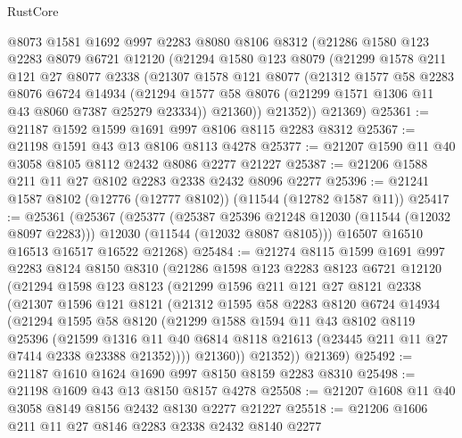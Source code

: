 \begin{lexlean}{RustCore}
\begin{coremodule}
    @8073
    @1581
    @1692
    @997
    @2283
    @8080
    @8106
    @8312
    (@21286
      @1580
      @123
      @2283
      @8079
      @6721
      @12120
      (@21294
        @1580
        @123
        @8079
        (@21299
          @1578
          @211
          @121
          @27
          @8077
          @2338
          (@21307
            @1578
            @121
            @8077
            (@21312
              @1577
              @58
              @2283
              @8076
              @6724
              @14934
              (@21294 @1577 @58 @8076 (@21299 @1571 @1306 @11 @43 @8060 @7387 @25279 @23334))
              @21360))
          @21352))
      @21369)
@25361 := @21187 @1592 @1599 @1691 @997 @8106 @8115 @2283 @8312
@25367 := @21198 @1591 @43 @13 @8106 @8113 @4278
@25377 := @21207 @1590 @11 @40 @3058 @8105 @8112 @2432 @8086 @2277 @21227
@25387 := @21206 @1588 @211 @11 @27 @8102 @2283 @2338 @2432 @8096 @2277
@25396 := @21241 @1587 @8102 (@12776 (@12777 @8102)) (@11544 (@12782 @1587 @11))
@25417 := @25361
    (@25367
      (@25377
        (@25387 @25396 @21248 @12030 (@11544 (@12032 @8097 @2283)))
        @12030
        (@11544 (@12032 @8087 @8105)))
      @16507
      @16510
      @16513
      @16517
      @16522
      @21268)
@25484 := @21274
    @8115
    @1599
    @1691
    @997
    @2283
    @8124
    @8150
    @8310
    (@21286
      @1598
      @123
      @2283
      @8123
      @6721
      @12120
      (@21294
        @1598
        @123
        @8123
        (@21299
          @1596
          @211
          @121
          @27
          @8121
          @2338
          (@21307
            @1596
            @121
            @8121
            (@21312
              @1595
              @58
              @2283
              @8120
              @6724
              @14934
              (@21294
                @1595
                @58
                @8120
                (@21299
                  @1588
                  @1594
                  @11
                  @43
                  @8102
                  @8119
                  @25396
                  (@21599
                    @1316
                    @11
                    @40
                    @6814
                    @8118
                    @21613
                    (@23445 @211 @11 @27 @7414 @2338 @23388 @21352))))
              @21360))
          @21352))
      @21369)
@25492 := @21187 @1610 @1624 @1690 @997 @8150 @8159 @2283 @8310
@25498 := @21198 @1609 @43 @13 @8150 @8157 @4278
@25508 := @21207 @1608 @11 @40 @3058 @8149 @8156 @2432 @8130 @2277 @21227
@25518 := @21206 @1606 @211 @11 @27 @8146 @2283 @2338 @2432 @8140 @2277

\end{coremodule}
\end{lexlean}
